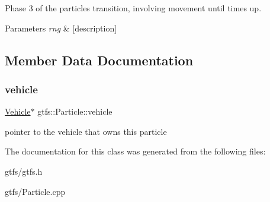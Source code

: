 Phase 3 of the particle\textquotesingle{}s transition, involving movement until time\textquotesingle{}s up.


\begin{DoxyParams}{Parameters}
{\em rng} & \mbox{[}description\mbox{]} \\
\hline
\end{DoxyParams}


\subsection{Member Data Documentation}
\mbox{\label{classgtfs_1_1Particle_a81c313d505ecb592d79463f167dfb76c}} 
\subsubsection{\texorpdfstring{vehicle}{vehicle}}
{\footnotesize\ttfamily \hyperlink{classgtfs_1_1Vehicle}{Vehicle}$\ast$ gtfs\+::\+Particle\+::vehicle}

pointer to the vehicle that owns this particle 

The documentation for this class was generated from the following files\+:\begin{DoxyCompactItemize}
\item 
gtfs/gtfs.\+h\item 
gtfs/Particle.\+cpp\end{DoxyCompactItemize}
